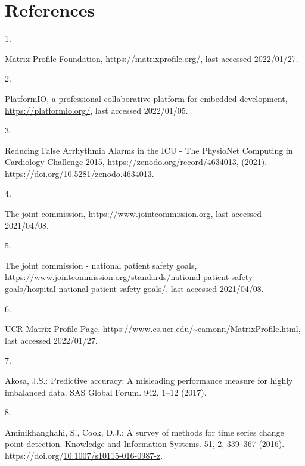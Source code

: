 \documentclass[runningheads]{llncs}
\newlength{\cslhangindent}
\newlength{\csllabelwidth}
\newenvironment{CSLReferences}[2] %
 {%
  \setlength{\parindent}{0pt}
  \ifodd #1 \everypar{\setlength{\hangindent}{\cslhangindent}}\ignorespaces\fi
  \ifnum #2 > 0
  \setlength{\parskip}{#2\baselineskip}
  \fi
 }%
 {}
\newcommand{\CSLLeftMargin}[1]{\parbox[t]{\csllabelwidth}{#1}}
\newcommand{\CSLRightInline}[1]{\parbox[t]{\linewidth - \csllabelwidth}{#1}\break}
\begin{document}
\hypertarget{references}{%
\section*{References}\label{references}}

\hypertarget{refs}{}
\begin{CSLReferences}{0}{0}
\leavevmode{}%
\CSLLeftMargin{1. }
\CSLRightInline{{Matrix Profile Foundation}, \url{https://matrixprofile.org/}, last accessed 2022/01/27.}

\leavevmode{}%
\CSLLeftMargin{2. }
\CSLRightInline{PlatformIO, a professional collaborative platform for embedded development, \url{https://platformio.org/}, last accessed 2022/01/05.}

\leavevmode{}%
\CSLLeftMargin{3. }
\CSLRightInline{Reducing False Arrhythmia Alarms in the ICU - The PhysioNet Computing in Cardiology Challenge 2015, \url{https://zenodo.org/record/4634013}, (2021). https://doi.org/\href{https://doi.org/10.5281/zenodo.4634013}{10.5281/zenodo.4634013}.}

\leavevmode{}%
\CSLLeftMargin{4. }
\CSLRightInline{The joint commission, \url{https://www.jointcommission.org}, last accessed 2021/04/08.}

\leavevmode{}%
\CSLLeftMargin{5. }
\CSLRightInline{The joint commission - national patient safety goals, \url{https://www.jointcommission.org/standards/national-patient-safety-goals/hospital-national-patient-safety-goals/}, last accessed 2021/04/08.}

\leavevmode{}%
\CSLLeftMargin{6. }
\CSLRightInline{{UCR Matrix Profile Page}, \url{https://www.cs.ucr.edu/~eamonn/MatrixProfile.html}, last accessed 2022/01/27.}

\leavevmode{}%
\CSLLeftMargin{7. }
\CSLRightInline{Akosa, J.S.: {Predictive accuracy: A misleading performance measure for highly imbalanced data}. SAS Global Forum. 942, 1--12 (2017).}

\leavevmode{}%
\CSLLeftMargin{8. }
\CSLRightInline{Aminikhanghahi, S., Cook, D.J.: A survey of methods for time series change point detection. Knowledge and Information Systems. 51, 2, 339--367 (2016). https://doi.org/\href{https://doi.org/10.1007/s10115-016-0987-z}{10.1007/s10115-016-0987-z}.}


\end{CSLReferences}
\end{document}

